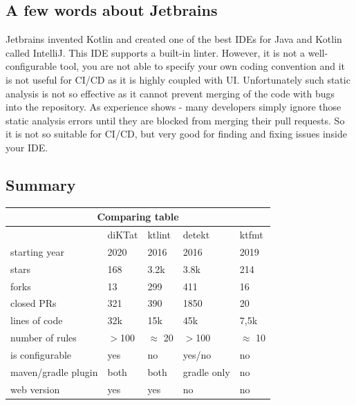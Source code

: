 \subsection{A few words about Jetbrains}
Jetbrains invented  Kotlin and created one of the best IDEs for Java and Kotlin called IntelliJ. This IDE supports a built-in linter. However, it is not a well-configurable tool, you are not able to specify your own coding convention and it is not useful for CI/CD as it is highly coupled with UI. Unfortunately such static analysis is not so effective as it cannot prevent merging of the code with bugs into the repository. As experience shows - many developers simply ignore those static analysis errors until they are blocked from merging their pull requests. So it is not so suitable for CI/CD, but very good for finding and fixing issues inside your IDE.

\subsection{Summary}

\begin{center}
\begin{tabular}{ |p{3cm}|p{2.5cm}|p{2.5cm}|p{2.5cm}|p{2.5cm}| }
\hline
\multicolumn{5}{|c|}{\textbf{Comparing table}} \\
\hline
& diKTat& ktlint &detekt & ktfmt \\
\hline
starting year & 2020 & 2016 & 2016 & 2019 \\
stars & 168 & 3.2k & 3.8k & 214\\ 
forks & 13 & 299 & 411 & 16\\
closed PRs & 321 & 390 & 1850 & 20 \\
lines of code & 32k & 15k & 45k & 7,5k\\
number of rules & $>$100 & $\approx$ 20 & $>$100 & $\approx$ 10 \\
is configurable & yes & no & yes/no & no \\
maven/gradle plugin & both & both & gradle only & no \\
web version & yes & yes & no & no \\
\hline

\hline
\end{tabular}
\end{center}